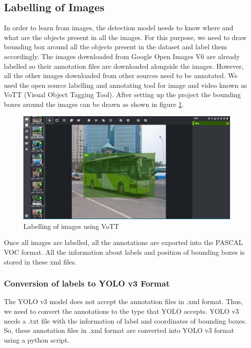  \subsection{Labelling of Images}
 In order to learn from images, the detection model needs to know where and what are the objects present in all the images. For this purpose, we need to draw bounding box around all the objects present in the dataset and label them accordingly. The images downloaded from Google Open Images V6 are already labelled so their annotation files are downloaded alongside the images. However, all the other images downloaded from other sources need to be annotated. We used the open source labelling and annotating tool for image and video known as VoTT (Visual Object Tagging Tool). After setting up the project the bounding boxes around the images can be drawn as shown in figure \ref{fig:5.7}.
\begin{figure}[H]
\centering
\captionsetup{justification = centering}
\includegraphics[scale= 0.35]{CHAPTERS/Chapter-5/images/5.7.PNG}
\caption{Labelling of images using VoTT } 
\label{fig:5.7}
\end{figure}
\noindent Once all images are labelled, all the annotations are exported into the PASCAL VOC format. All the information about labels and position of bounding boxes is stored in these xml files.
\subsubsection{Conversion of labels to YOLO v3 Format}
The YOLO v3 model does not accept the annotation files in .xml format. Thus, we need to convert the annotations to the type that YOLO accepts. YOLO v3 needs a .txt file with the information of label and coordinates of bounding boxes. So, these annotation files in .xml format are converted into YOLO v3 format using a python script. 

